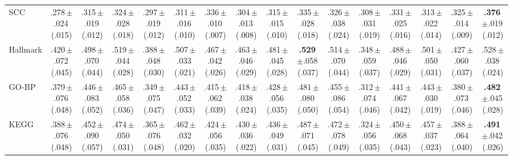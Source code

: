 \begin{table}
\begin{tabular}{lccccccccccccccc}
\quad SCC & .278\,{\tiny$\pm$.024}\,{\tiny(.015)} & .315\,{\tiny$\pm$.019}\,{\tiny(.012)} & .324\,{\tiny$\pm$.028}\,{\tiny(.018)} & .297\,{\tiny$\pm$.019}\,{\tiny(.012)} & .311\,{\tiny$\pm$.016}\,{\tiny(.010)} & .336\,{\tiny$\pm$.010}\,{\tiny(.007)} & .304\,{\tiny$\pm$.013}\,{\tiny(.008)} & .315\,{\tiny$\pm$.015}\,{\tiny(.010)} & .335\,{\tiny$\pm$.028}\,{\tiny(.018)} & .326\,{\tiny$\pm$.038}\,{\tiny(.024)} & .308\,{\tiny$\pm$.031}\,{\tiny(.019)} & .331\,{\tiny$\pm$.025}\,{\tiny(.016)} & .313\,{\tiny$\pm$.022}\,{\tiny(.014)} & .325\,{\tiny$\pm$.014}\,{\tiny(.009)} & \textbf{.376}\,{\tiny$\pm$.019}\,{\tiny(.012)}\\
\quad Hallmark & .420\,{\tiny$\pm$.072}\,{\tiny(.045)} & .498\,{\tiny$\pm$.070}\,{\tiny(.044)} & .519\,{\tiny$\pm$.044}\,{\tiny(.028)} & .388\,{\tiny$\pm$.048}\,{\tiny(.030)} & .507\,{\tiny$\pm$.033}\,{\tiny(.021)} & .467\,{\tiny$\pm$.042}\,{\tiny(.026)} & .463\,{\tiny$\pm$.046}\,{\tiny(.029)} & .481\,{\tiny$\pm$.045}\,{\tiny(.028)} & \textbf{.529}\,{\tiny$\pm$.058}\,{\tiny(.037)} & .514\,{\tiny$\pm$.070}\,{\tiny(.044)} & .348\,{\tiny$\pm$.059}\,{\tiny(.037)} & .488\,{\tiny$\pm$.046}\,{\tiny(.029)} & .501\,{\tiny$\pm$.050}\,{\tiny(.031)} & .427\,{\tiny$\pm$.060}\,{\tiny(.037)} & .528\,{\tiny$\pm$.038}\,{\tiny(.024)}\\
\quad GO-BP & .379\,{\tiny$\pm$.076}\,{\tiny(.048)} & .446\,{\tiny$\pm$.083}\,{\tiny(.052)} & .465\,{\tiny$\pm$.058}\,{\tiny(.036)} & .349\,{\tiny$\pm$.075}\,{\tiny(.047)} & .443\,{\tiny$\pm$.052}\,{\tiny(.033)} & .415\,{\tiny$\pm$.062}\,{\tiny(.039)} & .418\,{\tiny$\pm$.038}\,{\tiny(.024)} & .428\,{\tiny$\pm$.056}\,{\tiny(.035)} & .481\,{\tiny$\pm$.080}\,{\tiny(.050)} & .455\,{\tiny$\pm$.086}\,{\tiny(.054)} & .312\,{\tiny$\pm$.074}\,{\tiny(.046)} & .441\,{\tiny$\pm$.067}\,{\tiny(.042)} & .443\,{\tiny$\pm$.030}\,{\tiny(.019)} & .380\,{\tiny$\pm$.073}\,{\tiny(.046)} & \textbf{.482}\,{\tiny$\pm$.045}\,{\tiny(.028)}\\
\quad KEGG & .388\,{\tiny$\pm$.076}\,{\tiny(.048)} & .452\,{\tiny$\pm$.090}\,{\tiny(.057)} & .474\,{\tiny$\pm$.050}\,{\tiny(.031)} & .365\,{\tiny$\pm$.076}\,{\tiny(.048)} & .462\,{\tiny$\pm$.032}\,{\tiny(.020)} & .424\,{\tiny$\pm$.056}\,{\tiny(.035)} & .430\,{\tiny$\pm$.036}\,{\tiny(.022)} & .436\,{\tiny$\pm$.049}\,{\tiny(.031)} & .487\,{\tiny$\pm$.071}\,{\tiny(.045)} & .472\,{\tiny$\pm$.078}\,{\tiny(.049)} & .324\,{\tiny$\pm$.056}\,{\tiny(.035)} & .450\,{\tiny$\pm$.068}\,{\tiny(.043)} & .457\,{\tiny$\pm$.037}\,{\tiny(.023)} & .388\,{\tiny$\pm$.064}\,{\tiny(.040)} & \textbf{.491}\,{\tiny$\pm$.042}\,{\tiny(.026)}\\

\end{tabular}
\end{table}
